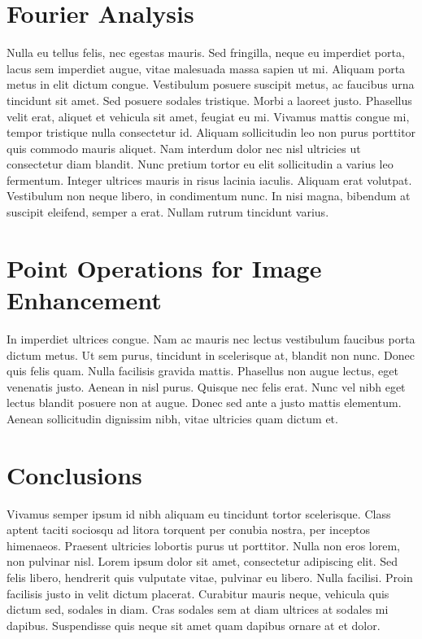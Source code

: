 \documentclass{sydeStyle}
\begin{document}
\section*{Fourier Analysis}
Nulla eu tellus felis, nec egestas mauris. Sed fringilla, neque eu
imperdiet porta, lacus sem imperdiet augue, vitae malesuada massa sapien
ut mi. Aliquam porta metus in elit dictum congue. Vestibulum posuere
suscipit metus, ac faucibus urna tincidunt sit amet. Sed posuere sodales
tristique. Morbi a laoreet justo. Phasellus velit erat, aliquet et
vehicula sit amet, feugiat eu mi. Vivamus mattis congue mi, tempor
tristique nulla consectetur id. Aliquam sollicitudin leo non purus
porttitor quis commodo mauris aliquet. Nam interdum dolor nec nisl
ultricies ut consectetur diam blandit. Nunc pretium tortor eu elit
sollicitudin a varius leo fermentum. Integer ultrices mauris in risus
lacinia iaculis. Aliquam erat volutpat. Vestibulum non neque libero, in
condimentum nunc. In nisi magna, bibendum at suscipit eleifend, semper a
erat. Nullam rutrum tincidunt varius.

\section*{Point Operations for Image Enhancement}
In imperdiet ultrices congue. Nam ac mauris nec lectus vestibulum faucibus
porta dictum metus. Ut sem purus, tincidunt in scelerisque at, blandit non
nunc. Donec quis felis quam. Nulla facilisis gravida mattis. Phasellus non
augue lectus, eget venenatis justo. Aenean in nisl purus. Quisque nec felis
erat. Nunc vel nibh eget lectus blandit posuere non at augue. Donec sed
ante a justo mattis elementum. Aenean sollicitudin dignissim nibh, vitae
ultricies quam dictum et.

\section*{Conclusions}
Vivamus semper ipsum id nibh aliquam eu tincidunt tortor scelerisque. Class
aptent taciti sociosqu ad litora torquent per conubia nostra, per inceptos
himenaeos. Praesent ultricies lobortis purus ut porttitor. Nulla non eros
lorem, non pulvinar nisl. Lorem ipsum dolor sit amet, consectetur
adipiscing elit. Sed felis libero, hendrerit quis vulputate vitae, pulvinar
eu libero. Nulla facilisi. Proin facilisis justo in velit dictum placerat.
Curabitur mauris neque, vehicula quis dictum sed, sodales in diam. Cras
sodales sem at diam ultrices at sodales mi dapibus. Suspendisse quis neque
sit amet quam dapibus ornare at et dolor.
\end{document}
